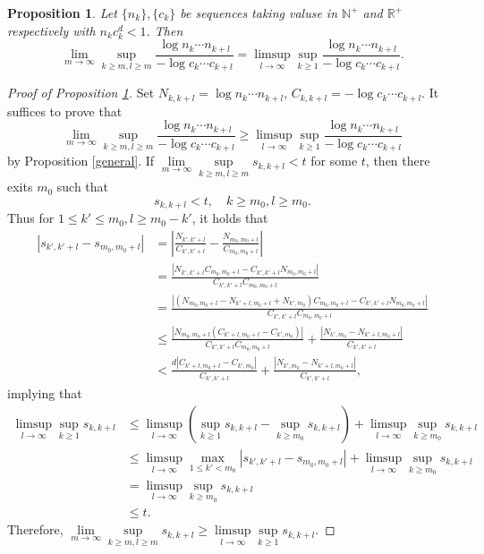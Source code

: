 \documentclass[12pt]{amsart}
\numberwithin{equation}{section}
\theoremstyle{plain}
\newtheorem{proposition}[theorem]{Proposition}
\theoremstyle{remark}
\theoremstyle{definition}
\newcommand{\R}{\mathbb{R}}
\newcommand{\N}{\mathbb{N}}
\newcommand{\f}{\frac}
\renewcommand{\ge}{\geqslant}
\renewcommand{\le}{\leqslant}
\begin{document}
	\iffalse
	\begin{proposition}\label{homo}
		Let $\{n_k\},\{c_{k}\}$ be sequences taking valuse in ${\N}^+$ and ${\R}^+$ respectively with $n_kc_k^d<1$. Then
		\[
		\lim\limits_{m\to \infty}\sup_{k\ge m,l\ge m}\frac{\log n_{k}\cdots n_{k+l}}{-\log c_{k}\cdots c_{k+l}}=\limsup_{l\to \infty}\sup_{k\ge1}\frac{\log n_{k}\cdots n_{k+l}}{-\log c_{k}\cdots c_{k+l}}.
		\]
	\end{proposition}
	\begin{proof}[Proof of Proposition \ref{homo}]
		Set $N_{k,k+l}=\log n_{k}\cdots n_{k+l},\,C_{k,k+l}=-\log c_{k}\cdots c_{k+l}$. It suffices to prove that 
		\[
		\lim\limits_{m\to \infty}\sup_{k\ge m,l\ge m}\frac{\log n_{k}\cdots n_{k+l}}{-\log c_{k}\cdots c_{k+l}}\ge\limsup_{l\to \infty}\sup_{k\ge1}\frac{\log n_{k}\cdots n_{k+l}}{-\log c_{k}\cdots c_{k+l}}
		\]
		by Proposition \ref{general}.
		If $\lim\limits_{m\to \infty}\sup\limits_{k\ge m,l\ge m}s_{k,k+l}<t$ for some $t$, then there exits $m_0$ such that
		\[
		s_{k,k+l}<t,\quad k\ge m_0,l\ge m_0.
		\]
		Thus for $1\le k'\le m_0, l
		\ge m_0-k'$, it holds that
		\begin{align*}
			|s_{k',k'+l}-s_{m_0,m_0+l}|&=\left|\f{N_{k',k'+l}}{C_{k',k'+l}}-\f{N_{m_0,m_0+l}}{C_{m_0,m_0+l}}\right|\\
			&=\f{|N_{k',k'+l}C_{m_0,m_0+l}-C_{k',k'+l}N_{m_0,m_0+l}|}{C_{k',k'+l}C_{m_0,m_0+l}}\\
			&=\f{|(N_{m_0,m_0+l}-N_{k'+l,m_0+l}+N_{k',m_0})C_{m_0,m_0+l}-C_{k',k'+l}N_{m_0,m_0+l}|}{C_{k',k'+l}C_{m_0,m_0+l}}\\
			&\le\f{|N_{m_0,m_0+l}(C_{k'+l,m_0+l}-C_{k',m_0})|}{C_{k',k'+l}C_{m_0,m_0+l}}+\f{|N_{k',m_0}-N_{k'+l,m_0+l}|}{C_{k',k'+l}}\\
			&<\f{d|C_{k'+l,m_0+l}-C_{k',m_0}|}{C_{k',k'+l}}+\f{|N_{k',m_0}-N_{k'+l,m_0+l}|}{C_{k',k'+l}},
		\end{align*}
		implying that
		\begin{align*}
			\limsup_{l\to\infty}\sup_{k\ge 1} s_{k,k+l}&\le \limsup_{l\to\infty} \left(\sup_{k\ge 1}s_{k,k+l}-\sup_{k\ge m_0}s_{k,k+l}\right)+\limsup_{l\to\infty}\sup_{k\ge m_0}s_{k,k+l}\\
			&\le \limsup_{l\to\infty}\max_{1\le k'<m_0}\left|s_{k',k'+l}-s_{m_0,m_0+l}\right|+\limsup_{l\to\infty}\sup_{k\ge m_0}s_{k,k+l}\\
			&=\limsup_{l\to\infty}\sup_{k\ge m_0}s_{k,k+l}\\
			&\le t.
		\end{align*}
		Therefore, $\lim\limits_{m\to \infty}\sup\limits_{k\ge m,l\ge m}s_{k,k+l}\ge\limsup\limits_{l\to\infty}\sup\limits_{k\ge 1} s_{k,k+l}$.
	\end{proof}
\end{document}
